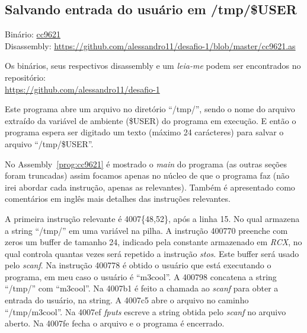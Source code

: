\subsection{Salvando entrada do usuário em /tmp/\$USER}
\noindent Binário: \href{https://s3.amazonaws.com/chaordic-desafio-cloud/cc9621}{cc9621}\\
Disassembly: \href{https://github.com/alessandro11/desafio-1/blob/master/cc9621.as}{https://github.com/alessandro11/desafio-1/blob/master/cc9621.as}\\
\par
Os binários, seus respectivos disassembly e um \textit{leia-me} podem
ser encontrados no repositório:\\
\href{https://github.com/alessandro11/desafio-1}{https://github.com/alessandro11/desafio-1}\\

\par Este programa abre um arquivo no diretório ``/tmp/'', sendo o nome do
arquivo extraído da variável de ambiente (\$USER) do programa em execução. E
então o programa espera ser digitado um texto (máximo 24 carácteres)
para salvar o arquivo ``/tmp/\$USER''.



No Assembly~\ref{prog:cc9621} é mostrado o \emph{main} do programa (as
outras seções foram truncadas) assim focamos apenas no núcleo de que o
programa faz (não irei abordar cada instrução, apenas as
relevantes). Também é apresentado como comentários em inglês mais
detalhes das instruções relevantes.

A primeira instrução relevante é 4007\{48,52\}, após a linha 15. No qual
armazena a string ``/tmp/'' em uma variável na pilha. A instrução
400770 preenche com zeros um buffer de tamanho 24, indicado pela
constante armazenado em \emph{RCX}, no qual controla quantas vezes será
repetido a instrução \emph{stos}. Este buffer será usado pelo
\emph{scanf}. Na instrução 400778 é obtido o usuário que está
executando o programa, em meu caso o usuário é ``m3cool''. A 400798
concatena a string ``/tmp/'' com ``m3cool''. Na 4007b1 é feito a
chamada ao \emph{scanf} para obter a entrada do usuário, na string. A
4007c5 abre o arquivo no caminho ``/tmp/m3cool''. Na
4007ef \emph{fputs} escreve a string obtida pelo \emph{scanf} no
arquivo aberto. Na 4007fe fecha o arquivo e o programa é encerrado.



